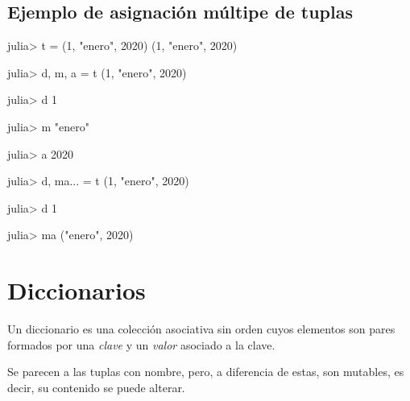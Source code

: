 \documentclass[
  letterpaper,
  DIV=11,
  numbers=noendperiod]{scrreprt}
\newenvironment{Shaded}{\begin{snugshade}}{\end{snugshade}}
\newcommand{\FloatTok}[1]{\textcolor[rgb]{0.68,0.00,0.00}{#1}}
\newcommand{\NormalTok}[1]{\textcolor[rgb]{0.00,0.23,0.31}{#1}}
\newcommand{\OperatorTok}[1]{\textcolor[rgb]{0.37,0.37,0.37}{#1}}
\newcommand{\StringTok}[1]{\textcolor[rgb]{0.13,0.47,0.30}{#1}}
\begin{document}
\hypertarget{ejemplo-de-asignaciuxf3n-muxfaltipe-de-tuplas}{%
\subsection{Ejemplo de asignación múltipe de
tuplas}\label{ejemplo-de-asignaciuxf3n-muxfaltipe-de-tuplas}}

\begin{Shaded}
\begin{Highlighting}[]
\NormalTok{julia}\OperatorTok{\textgreater{}}\NormalTok{ t }\OperatorTok{=}\NormalTok{ (}\FloatTok{1}\NormalTok{, }\StringTok{"enero"}\NormalTok{, }\FloatTok{2020}\NormalTok{)}
\NormalTok{(}\FloatTok{1}\NormalTok{, }\StringTok{"enero"}\NormalTok{, }\FloatTok{2020}\NormalTok{)}

\NormalTok{julia}\OperatorTok{\textgreater{}}\NormalTok{ d, m, a }\OperatorTok{=}\NormalTok{ t}
\NormalTok{(}\FloatTok{1}\NormalTok{, }\StringTok{"enero"}\NormalTok{, }\FloatTok{2020}\NormalTok{)}

\NormalTok{julia}\OperatorTok{\textgreater{}}\NormalTok{ d}
\FloatTok{1}

\NormalTok{julia}\OperatorTok{\textgreater{}}\NormalTok{ m}
\StringTok{"enero"}

\NormalTok{julia}\OperatorTok{\textgreater{}}\NormalTok{ a}
\FloatTok{2020}

\NormalTok{julia}\OperatorTok{\textgreater{}}\NormalTok{ d, ma}\OperatorTok{...} \OperatorTok{=}\NormalTok{ t }
\NormalTok{(}\FloatTok{1}\NormalTok{, }\StringTok{"enero"}\NormalTok{, }\FloatTok{2020}\NormalTok{)}

\NormalTok{julia}\OperatorTok{\textgreater{}}\NormalTok{ d}
\FloatTok{1}

\NormalTok{julia}\OperatorTok{\textgreater{}}\NormalTok{ ma}
\NormalTok{(}\StringTok{"enero"}\NormalTok{, }\FloatTok{2020}\NormalTok{)}
\end{Highlighting}
\end{Shaded}

\hypertarget{diccionarios}{%
\section{Diccionarios}\label{diccionarios}}

Un diccionario es una colección asociativa sin orden cuyos elementos son
pares formados por una \emph{clave} y un \emph{valor} asociado a la
clave.

Se parecen a las tuplas con nombre, pero, a diferencia de estas, son
mutables, es decir, su contenido se puede alterar.
\end{document}
